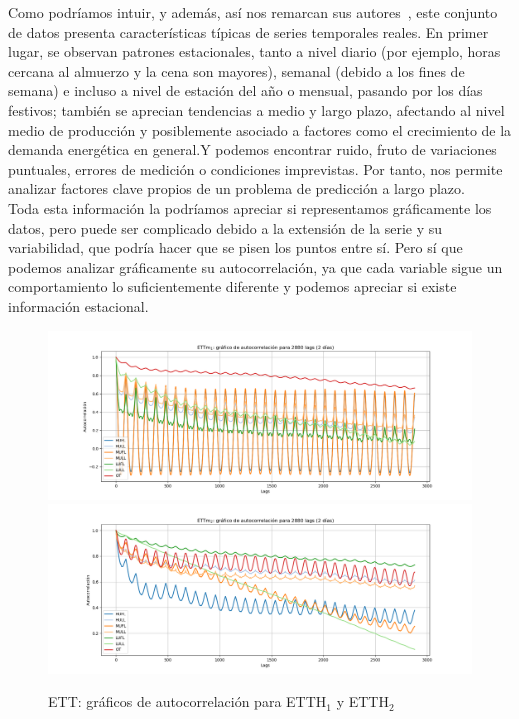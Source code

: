 Como podríamos intuir, y además, así nos remarcan sus autores~\cite{zhou2021etdataset}, este conjunto de datos presenta características típicas de series temporales reales. En primer lugar, se observan patrones estacionales, tanto a nivel diario (por ejemplo, horas cercana al almuerzo y la cena son mayores), semanal (debido a los fines de semana) e incluso a nivel de estación del año o mensual, pasando por los días festivos; también se aprecian tendencias a medio y largo plazo, afectando al nivel medio de producción y posiblemente asociado a factores como el crecimiento de la demanda energética en general.Y podemos encontrar ruido, fruto de variaciones puntuales, errores de medición o condiciones imprevistas. Por tanto, nos permite analizar factores clave propios de un problema de predicción a largo plazo.\\

Toda esta información la podríamos apreciar si representamos gráficamente los datos, pero puede ser complicado debido a la extensión de la serie y su variabilidad, que podría hacer que se pisen los puntos entre sí. Pero sí que podemos analizar gráficamente su autocorrelación, ya que cada variable sigue un comportamiento lo suficientemente diferente y podemos apreciar si existe información estacional. 

\begin{figure}[!ht]
	\centering
	\includegraphics[scale=0.37]{img/etth1_autocorrelacion.png}
	\includegraphics[scale=0.37]{img/etth2_autocorrelacion.png}
	\caption{ETT: gráficos de autocorrelación para ETTH$_1$ y ETTH$_2$}
	\label{autoett}
\end{figure}

